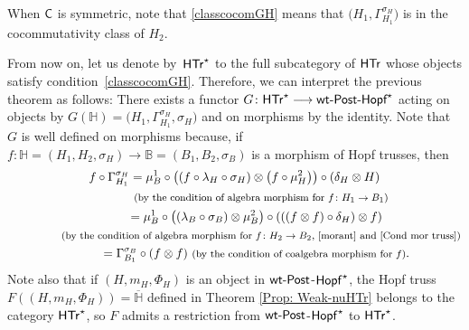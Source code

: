 \documentclass[pdftex]{sigma}
\numberwithin{equation}{section}
\begin{document}
\begin{Remark}
When $\sf{C}$ is symmetric, note that \eqref{classcocomGH} means that $\bigl(H_{1},\Gamma_{H_{1}}^{\sigma_{H}}\bigr)$ is in the cocommutativity class of $H_{2}$.
\end{Remark}
From now on, let us denote by~$\sf{HTr}^{\star}$ to the full subcategory of $\sf{HTr}$ whose objects satisfy condition~\eqref{classcocomGH}. Therefore, we can interpret the previous theorem as follows: There exists a functor
$G\colon \sf{HTr}^{\star}\longrightarrow \textnormal{{\sf wt}-{\sf Post}-{\sf Hopf}}^{\star}$
acting on objects by $G(\mathbb{H})=\bigl(H_{1},\Gamma_{H_{1}}^{\sigma_{H}},\sigma_{H}\bigr)$ and on morphisms by the identity. Note that $G$ is well defined on morphisms because, if $f\colon \mathbb{H}=(H_{1},H_{2},\sigma_{H})\rightarrow \mathbb{B}=(B_{1},B_{2},\sigma_{B})$ is a morphism of Hopf trusses, then
\begin{gather}
 f\circ\Gamma_{H_{1}}^{\sigma_{H}} = \mu_{B}^{1}\circ\bigl((f\circ\lambda_{H}\circ\sigma_{H})\otimes\bigl(f\circ \mu_{H}^{2}\bigr)\bigr)\circ(\delta_{H}\otimes H)\nonumber\\
\hphantom{f\circ\Gamma_{H_{1}}^{\sigma_{H}}=}{}
\text{\footnotesize\textnormal{(by the condition of algebra morphism for $f\colon H_{1}\rightarrow B_{1}$)}}\nonumber\\ \hphantom{f\circ\Gamma_{H_{1}}^{\sigma_{H}}}{}
= \mu_{B}^{1}\circ\bigl((\lambda_{B}\circ\sigma_{B})\otimes\mu_{B}^{2}\bigr)\circ(((f\otimes f)\circ\delta_{H})\otimes f)\nonumber\\ \hphantom{f\circ\Gamma_{H_{1}}^{\sigma_{H}}=}{}
 \text{\footnotesize\textnormal{(by the condition of algebra morphism for $f\colon H_{2}\rightarrow B_{2}$, \eqref{morant} and \eqref{Cond mor truss})}}\nonumber\\ \hphantom{f\circ\Gamma_{H_{1}}^{\sigma_{H}}}{}
= \Gamma_{B_{1}}^{\sigma_{B}}\circ(f\otimes f)\ \text{\footnotesize\textnormal{(by the condition of coalgebra morphism for $f$)}}.\label{gammatrussf}
\end{gather}
Note also that if $(H,m_{H},\Phi_{H})$ is an object in ${\sf wt}\textnormal{-}{\sf Post}$-${\sf Hopf}^{\star}$, the Hopf truss $F((H,m_{H},\Phi_{H}))=\overline{\mathbb{H}}$ defined in Theorem \ref{Prop: Weak-nuHTr} belongs to the category $\sf{HTr}^{\star}$, so $F$ admits a restriction from ${\sf wt}\textnormal{-}{\sf Post}$-${\sf Hopf}^{\star}$ to $\sf{HTr}^{\star}$.
\end{document}
